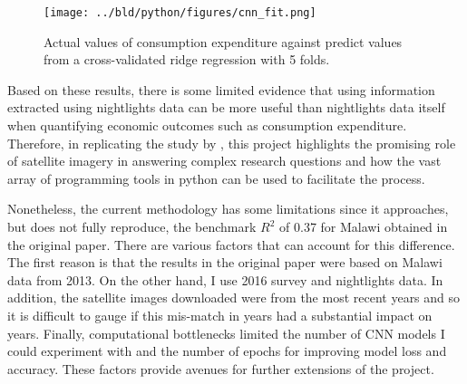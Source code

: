\documentclass[11pt, a4paper, leqno]{article}
\begin{document}
\begin{figure}[H]
\centering
    \texttt{[image: ../bld/python/figures/cnn\_fit.png]}
    \caption{Actual values of consumption expenditure against predict values from a cross-validated ridge regression with 5 folds.}
    \label{fig:python-predictions}
\end{figure}

Based on these results, there is some limited evidence that using information extracted using nightlights data can be more useful than nightlights data itself when quantifying economic outcomes such as consumption expenditure. Therefore, in replicating the study by \citet{jean2016combining}, this project highlights the promising role of satellite imagery in answering complex research questions and how the vast array of programming tools in python can be used to facilitate the process. 

Nonetheless, the current methodology has some limitations since it approaches, but does not fully reproduce, the benchmark $R^2$ of 0.37 for Malawi obtained in the original paper. There are various factors that can account for this difference. The first reason is that the results in the original paper were based on Malawi data from 2013. On the other hand, I use 2016 survey and nightlights data. In addition, the satellite images downloaded were from the most recent years and so it is difficult to gauge if this mis-match in years had a substantial impact on years. Finally, computational bottlenecks limited the number of CNN models I could experiment with and the number of epochs for improving model loss and accuracy. These factors provide avenues for further extensions of the project. 

\printbibliography
{}
\end{document}
